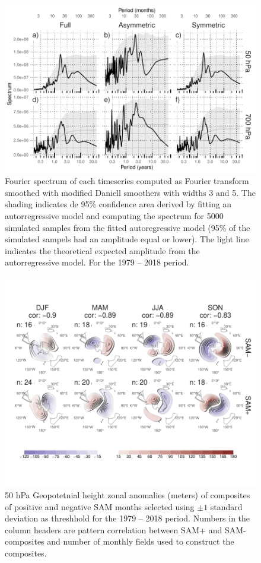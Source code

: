 \documentclass[smallextended]{svjour3}       %
\begin{document}
\begin{figure}
\includegraphics{A2-1} \caption{Fourier spectrum of each timeseries computed as Fourier transform smoothed with modified Daniell smoothers with widths 3 and 5. The shading indicates de 95\% confidence area derived by fitting an autorregressive model and computing the spectrum for 5000 simulated samples from the fitted autoregressive model (95\% of the simulated sampels had an amplitude equal or lower). The light line indicates the theoretical expected amplitude from the autorregressive model. For the 1979 -- 2018 period.}\label{fig:A2}
\end{figure}

\begin{figure}
\includegraphics{A3-1} \caption{50 hPa Geopotetnial height zonal anomalies (meters) of composites of positive and negative SAM months selected using $\pm1$ standard deviation as threshhold for the 1979 -- 2018 period. Numbers in the column headers are pattern correlation between SAM+ and SAM- composites and number of monthly fields used to construct the composites.}\label{fig:A3}
\end{figure}
\end{document}
